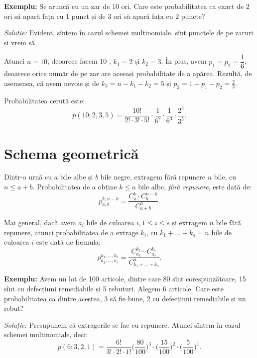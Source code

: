 \vspace{0.3cm}

\textbf{Exemplu:} Se aruncă cu un zar de 10 ori. Care este probabilitatea
ca exact de 2 ori să apară fața cu 1 punct și de 3 ori să apară fața cu 2 puncte?

\emph{Soluție:} Evident, sîntem în cazul schemei multinomiale. 
sînt punctele de pe zaruri și vrem să .

Atunci $ n = 10 $, deoarece facem 10 , $ k_1 = 2 $ și $ k_2 = 3 $.
În plus, avem $ p_1 = p_2 = \dfrac{1}{6} $, deoarece orice număr de pe zar are
aceeași probabilitate de a apărea. Rezultă, de asemenea, că avem nevoie și
de $ k_3 = n - k_1 - k_2 = 5 $ și $ p_3 = 1 - p_1 - p_2 = \frac{2}{3} $.

Probabilitatea cerută este:
\[
  p(10; 2, 3, 5) = \frac{10!}{2! \cdot 3! \cdot 5!} \cdot %
  \frac{1}{6^2} \cdot \frac{1}{6^3} \cdot \frac{2^5}{3^5}.
\]


\section{Schema geometrică}

\indent\indent Dintr-o urnă cu $ a $ bile albe și $ b $ bile negre, extragem
fără repunere $ n $ bile, cu $ n \leq a + b $. Probabilitatea de a obține
$ k \leq a $ bile albe, \emph{fără repunere}, este dată de:
\[
  p_{a, b}^{k, n - k} = \frac{C_a^k \cdot C_b^{n-k}}{C_{a+b}^n}.
\]

Mai general, dacă avem $ a_i $ bile de culoarea $ i, 1 \leq i \leq s $ și
extragem $ n $ bile fără repunere, atunci probabilitatea de a extrage $ k_i $,
cu $ k_1 + \dots + k_s = n $ bile de culoarea $ i $ este dată de formula:
\[
  p_{a_1, \dots, a_s}^{k_1, \dots, k_s} = %
  \frac{C_{a_1}^{k_1} \cdots C_{a_s}^{k_s}}{C_{k_1 + \dots + k_s}^n}.
\]

\vspace{0.3cm}

\textbf{Exemplu:} Avem un lot de 100 articole, dintre care 80 sînt corespunzătoare,
15 sînt cu defecțiuni remediabile și 5 rebuturi. Alegem 6 articole. Care este
probabilitatea ca dintre acestea, 3 să fie bune, 2 cu defecțiuni remediabile și
un rebut?

\emph{Soluție:} Presupunem că extragerile se fac cu repunere. Atunci sîntem în cazul
schemei multinomiale, deci:
\[
  p(6; 3, 2, 1) = \frac{6!}{3! \cdot 2! \cdot 1!} \Big(\frac{80}{100}\Big)^3 \cdot %
  \Big( \frac{15}{100} \Big)^2 \cdot \Big( \frac{5}{100} \Big)^1.
\]

